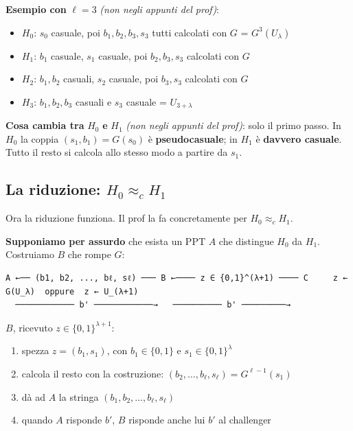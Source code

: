 \begin{esempio}

\textbf{Esempio con} \(\ell = 3\) \emph{(non negli appunti del prof)}:

\begin{itemize}
\tightlist
\item
  \(H_0\): \(s_0\) casuale, poi \(b_1, b_2, b_3, s_3\) tutti calcolati con \(G\) = \(G^3(U_\lambda)\)
\item
  \(H_1\): \(b_1\) casuale, \(s_1\) casuale, poi \(b_2, b_3, s_3\) calcolati con \(G\)
\item
  \(H_2\): \(b_1, b_2\) casuali, \(s_2\) casuale, poi \(b_3, s_3\) calcolati con \(G\)
\item
  \(H_3\): \(b_1, b_2, b_3\) casuali e \(s_3\) casuale = \(U_{3+\lambda}\)
\end{itemize}

\end{esempio}

\textbf{Cosa cambia tra} \(H_0\) \textbf{e} \(H_1\) \emph{(non negli appunti del prof)}: solo il primo passo. In \(H_0\) la coppia \((s_1, b_1) = G(s_0)\) è \textbf{pseudocasuale}; in \(H_1\) è \textbf{davvero casuale}. Tutto il resto si calcola allo stesso modo a partire da \(s_1\).

\subsection{\texorpdfstring{La riduzione: \(H_0 \approx_c H_1\)}{La riduzione: H\_0 \textbackslash approx\_c H\_1}}

Ora la riduzione funziona. Il prof la fa concretamente per \(H_0 \approx_c H_1\).

\textbf{Supponiamo per assurdo} che esista un PPT \(A\) che distingue \(H_0\) da \(H_1\). Costruiamo \(B\) che rompe \(G\):

\begin{verbatim}
A ←── (b1, b2, ..., bℓ, sℓ) ─── B ←──── z ∈ {0,1}^(λ+1) ──── C     z ← G(U_λ)  oppure  z ← U_(λ+1)
  ──────────── b' ────────────→   ────────── b' ─────────→
\end{verbatim}

\(B\), ricevuto \(z \in \{0,1\}^{\lambda+1}\):

\begin{enumerate}
\def\labelenumi{\arabic{enumi}.}
\tightlist
\item
  spezza \(z = (b_1, s_1)\), con \(b_1 \in \{0,1\}\) e \(s_1 \in \{0,1\}^\lambda\)
\item
  calcola il resto con la costruzione: \((b_2, \dots, b_\ell, s_\ell) = G^{\ell-1}(s_1)\)
\item
  dà ad \(A\) la stringa \((b_1, b_2, \dots, b_\ell, s_\ell)\)
\item
  quando \(A\) risponde \(b'\), \(B\) risponde anche lui \(b'\) al challenger
\end{enumerate}

